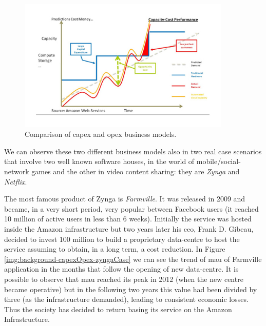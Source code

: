 \begin{figure}
	\centering{}
	\includegraphics[width=0.9\textwidth]{chapters/background/images/capex-opex.png}
	\caption[Comparison between \acs{capex} and \acs{opex} business models]{Comparison of \acf{capex}
		and \acf{opex} business models.}
	\label{img:background-capexOpex-model}
\end{figure}

We can observe these two different business models also in two real case scenarios \cite{netflixZynga}
that involve two well known software houses, in the world of mobile/social-network games and the other
in video content sharing: they are \textit{Zynga} and \textit{Netflix}. 

The most famous product of Zynga is \textit{Farmville}. It was released in 2009 and became, in a very
short period, very popular between Facebook users (it reached 10 million of active users in less than
6 weeks). Initially the service was hosted inside the Amazon infrastructure but two years later his
\acs{ceo}, Frank D. Gibeau, decided to invest \textdollar{}100 million to build a proprietary data-centre
to host the service assuming to obtain, in a long term, a cost reduction. In Figure
\ref{img:background-capexOpex-zyngaCase} we can see the trend of \ac{mau} of Farmville application
in the months that follow the opening of new data-centre. It is possible to observe that \ac{mau} reached
its peak in 2012 (when the new centre became operative) but in the following two years this value had
been divided by three (as the infrastructure demanded), leading to consistent economic losses.
Thus the society has decided to return basing its service on the Amazon Infrastructure.

